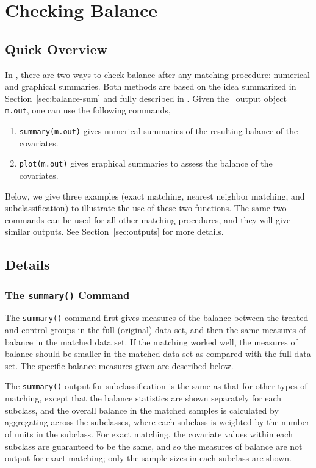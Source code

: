 \section{Checking Balance}
\label{sec:balance}

\subsection{Quick Overview}

In \MatchIt, there are two ways to check balance after any matching
procedure: numerical and graphical summaries. Both methods are based
on the idea summarized in Section~\ref{sec:balance-sum} and fully
described in \citet*{HoImaKin05}. Given the \MatchIt\ output object
{\tt m.out}, one can use the following commands,
\begin{enumerate}
\item \texttt{summary(m.out)} gives numerical summaries of the
  resulting balance of the covariates.
  
\item \texttt{plot(m.out)} gives graphical summaries to assess the
  balance of the covariates.
\end{enumerate}
Below, we give three examples (exact matching, nearest neighbor
matching, and subclassification) to illustrate the use of these two
functions. The same two commands can be used for all other matching
procedures, and they will give similar outputs.  See
Section~\ref{sec:outputs} for more details.


\subsection{Details}


\subsubsection{The {\tt summary()} Command}

The \texttt{summary()} command first gives measures of the balance
between the treated and control groups in the full (original) data
set, and then the same measures of balance in the matched data set.
If the matching worked well, the measures of balance should be smaller
in the matched data set as compared with the full data set.  The
specific balance measures given are described below.

The \texttt{summary()} output for subclassification is the same as
that for other types of matching, except that the balance statistics
are shown separately for each subclass, and the overall balance in the
matched samples is calculated by aggregating across the subclasses,
where each subclass is weighted by the number of units in the
subclass.  For exact matching, the covariate values within each
subclass are guaranteed to be the same, and so the measures of balance
are not output for exact matching; only the sample sizes in each
subclass are shown.

